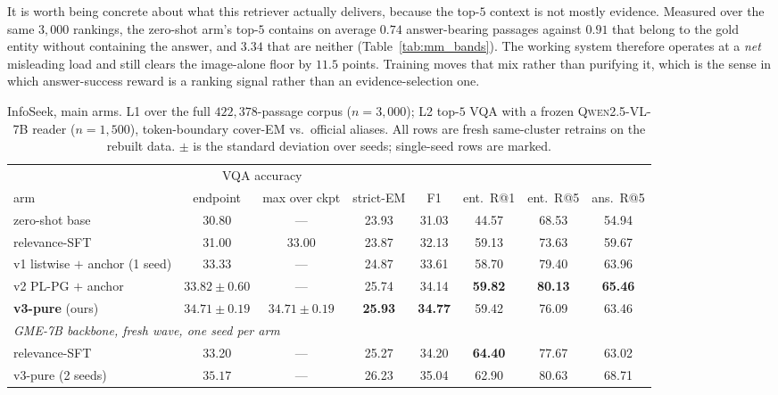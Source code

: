 It is worth being concrete about what this retriever actually delivers, because the top-$5$
context is not mostly evidence. Measured over the same $3{,}000$ rankings, the zero-shot arm's
top-$5$ contains on average $0.74$ answer-bearing passages against $0.91$ that belong to the gold
entity without containing the answer, and $3.34$ that are neither
(Table~\ref{tab:mm_bands}). The working system therefore operates at a \emph{net} misleading
load and still clears the image-alone floor by $11.5$ points. Training moves that mix rather than
purifying it, which is the sense in which answer-success reward is a ranking signal rather than
an evidence-selection one.

\begin{table}[t]
\centering\small
\caption{InfoSeek, main arms. L1 over the full $422{,}378$-passage corpus ($n{=}3{,}000$);
L2 top-$5$ VQA with a frozen \textsc{Qwen2.5-VL-7B} reader ($n{=}1{,}500$), token-boundary
cover-EM vs.\ official aliases. All rows are fresh same-cluster retrains on the rebuilt data.
$\pm$ is the standard deviation over seeds; single-seed rows are marked.}
\label{tab:mm_main}
\begin{tabular}{lccccccc}
\toprule
& \multicolumn{2}{c}{VQA accuracy} & & & & & \\
\cmidrule(lr){2-3}
arm & endpoint & max over ckpt & strict-EM & F1 & ent.\ R@1 & ent.\ R@5 & ans.\ R@5 \\
\midrule
zero-shot base            & 30.80 & --- & 23.93 & 31.03 & 44.57 & 68.53 & 54.94 \\
relevance-SFT             & 31.00 & 33.00 & 23.87 & 32.13 & 59.13 & 73.63 & 59.67 \\
v1 listwise $+$ anchor (1 seed) & 33.33 & --- & 24.87 & 33.61 & 58.70 & 79.40 & 63.96 \\
v2 PL-PG $+$ anchor       & $33.82 \pm 0.60$ & --- & 25.74 & 34.14 & \textbf{59.82} & \textbf{80.13} & \textbf{65.46} \\
\textbf{v3-pure} (ours)   & $\mathbf{34.71 \pm 0.19}$ & $\mathbf{34.71 \pm 0.19}$ & \textbf{25.93} & \textbf{34.77} & 59.42 & 76.09 & 63.46 \\
\midrule
\multicolumn{8}{l}{\emph{\textsc{GME-7B} backbone, fresh wave, one seed per arm}} \\
relevance-SFT             & 33.20 & --- & 25.27 & 34.20 & \textbf{64.40} & 77.67 & 63.02 \\
v3-pure (2 seeds)         & $35.17$ & --- & 26.23 & 35.04 & 62.90 & 80.63 & 68.71 \\
\bottomrule
\end{tabular}


\end{table}
